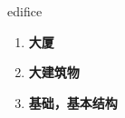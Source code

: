 
\begin{frame}
{\huge edifice}
\begin{center}
\begin{enumerate}\Large
  \item \textbf{大厦}
  \item \textbf{大建筑物}
  \item \textbf{基础，基本结构}
\end{enumerate}
\end{center}
\end{frame}
